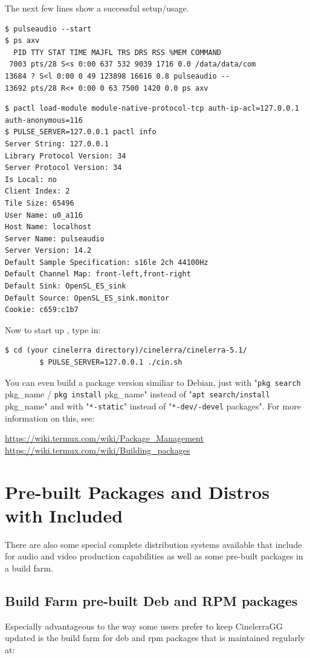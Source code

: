 The next few lines show a successful setup/usage.
\begin{lstlisting}[style=sh]
$ pulseaudio --start
$ ps axv
  PID TTY STAT TIME MAJFL TRS DRS RSS %MEM COMMAND
 7003 pts/28 S<s 0:00 637 532 9039 1716 0.0 /data/data/com
13684 ? S<l 0:00 0 49 123898 16616 0.8 pulseaudio --
13692 pts/28 R<+ 0:00 0 63 7500 1420 0.0 ps axv
\end{lstlisting}
\begin{lstlisting}[style=sh]
$ pactl load-module module-native-protocol-tcp auth-ip-acl=127.0.0.1 auth-anonymous=116
$ PULSE_SERVER=127.0.0.1 pactl info
Server String: 127.0.0.1
Library Protocol Version: 34
Server Protocol Version: 34
Is Local: no
Client Index: 2
Tile Size: 65496
User Name: u0_a116
Host Name: localhost
Server Name: pulseaudio
Server Version: 14.2
Default Sample Specification: s16le 2ch 44100Hz
Default Channel Map: front-left,front-right
Default Sink: OpenSL_ES_sink
Default Source: OpenSL_ES_sink.monitor
Cookie: c659:c1b7
\end{lstlisting}

Now to start up \CGG{}, type in:
\begin{lstlisting}[style=sh]
        $ cd (your cinelerra directory)/cinelerra/cinelerra-5.1/
        $ PULSE_SERVER=127.0.0.1 ./cin.sh
\end{lstlisting}

You can even build a package version similiar to Debian, just with "\texttt{pkg search} pkg\_name / \texttt{pkg install}
 pkg\_name" instead of "\texttt{apt search/install} pkg\_name" and with "\texttt{*-static}" instead of "\texttt{*-dev/-devel} packages".
For more information on this, see:

\url{https://wiki.termux.com/wiki/Package\_Management}
\newline \url{https://wiki.termux.com/wiki/Building\_packages}

\section{Pre-built Packages and Distros with \CGG{} Included}%
\label{sec:distro_with_cinelerra_included}

There are also some special complete distribution systems
available that include \CGG{} for audio and video production
capabilities as well as some pre-built packages in a build farm.

\subsection{Build Farm pre-built Deb and RPM packages}
\label{sec:packages}
Especially advantageous to the way some users prefer to keep CinelerraGG updated
is the build farm for \CGG{} deb and rpm packages that is maintained regularly
at:


